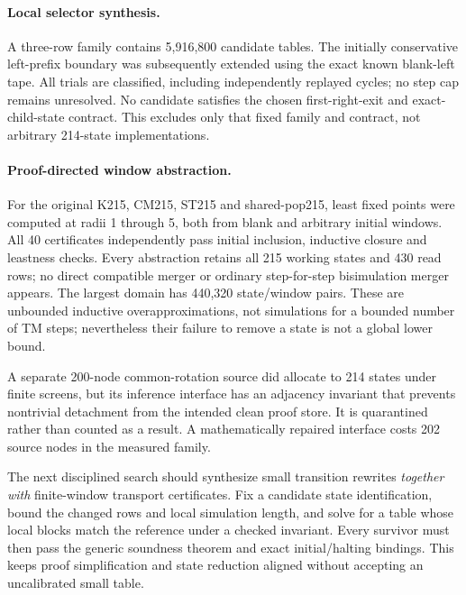 \documentclass[11pt]{article}
\begin{document}
\paragraph{Local selector synthesis.}
A three-row family contains 5,916,800 candidate tables. The initially conservative left-prefix boundary was subsequently extended using the exact known blank-left tape. All trials are classified, including independently replayed cycles; no step cap remains unresolved. No candidate satisfies the chosen first-right-exit and exact-child-state contract. This excludes only that fixed family and contract, not arbitrary 214-state implementations.

\paragraph{Proof-directed window abstraction.}
For the original K215, CM215, ST215 and shared-pop215, least fixed points were computed at radii 1 through 5, both from blank and arbitrary initial windows. All 40 certificates independently pass initial inclusion, inductive closure and leastness checks. Every abstraction retains all 215 working states and 430 read rows; no direct compatible merger or ordinary step-for-step bisimulation merger appears. The largest domain has 440,320 state/window pairs. These are unbounded inductive overapproximations, not simulations for a bounded number of TM steps; nevertheless their failure to remove a state is not a global lower bound.

A separate 200-node common-rotation source did allocate to 214 states under finite screens, but its inference interface has an adjacency invariant that prevents nontrivial detachment from the intended clean proof store. It is quarantined rather than counted as a result. A mathematically repaired interface costs 202 source nodes in the measured family.

The next disciplined search should synthesize small transition rewrites \emph{together with} finite-window transport certificates. Fix a candidate state identification, bound the changed rows and local simulation length, and solve for a table whose local blocks match the reference under a checked invariant. Every survivor must then pass the generic soundness theorem and exact initial/halting bindings. This keeps proof simplification and state reduction aligned without accepting an uncalibrated small table.
\end{document}

